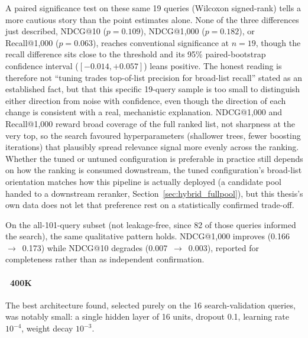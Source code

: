 \documentclass[a4paper,oneside,bibliography=totoc]{scrbook}
\begin{document}
A paired significance test on these same 19 queries (Wilcoxon signed-rank) tells a more cautious story than the point estimates alone. None of the three differences just described, NDCG@10 ($p=0.109$), NDCG@1{,}000 ($p=0.182$), or Recall@1{,}000 ($p=0.063$), reaches conventional significance at $n=19$, though the recall difference sits close to the threshold and its 95\% paired-bootstrap confidence interval ($[-0.014, +0.057]$) leans positive. The honest reading is therefore not ``tuning trades top-of-list precision for broad-list recall'' stated as an established fact, but that this specific 19-query sample is too small to distinguish either direction from noise with confidence, even though the direction of each change is consistent with a real, mechanistic explanation. NDCG@1{,}000 and Recall@1{,}000 reward broad coverage of the full ranked list, not sharpness at the very top, so the search favoured hyperparameters (shallower trees, fewer boosting iterations) that plausibly spread relevance signal more evenly across the ranking. Whether the tuned or untuned configuration is preferable in practice still depends on how the ranking is consumed downstream, the tuned configuration's broad-list orientation matches how this pipeline is actually deployed (a candidate pool handed to a downstream reranker, Section~\ref{sec:hybrid_fullpool}), but this thesis's own data does not let that preference rest on a statistically confirmed trade-off.

On the all-101-query subset (not leakage-free, since 82 of those queries informed the search), the same qualitative pattern holds. NDCG@1{,}000 improves (0.166~$\to$~0.173) while NDCG@10 degrades (0.007~$\to$~0.003), reported for completeness rather than as independent confirmation.

\label{subsec:neural_fusion_ranker_result}

\paragraph{~400K} The best architecture found, selected purely on the 16 search-validation queries, was notably small: a single hidden layer of 16 units, dropout 0.1, learning rate $10^{-4}$, weight decay $10^{-3}$.
\end{document}
